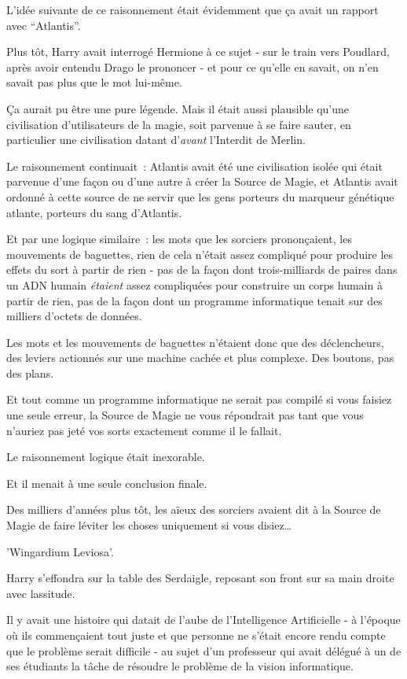 L'idée suivante de ce raisonnement était évidemment que ça avait un rapport avec “Atlantis”.

Plus tôt, Harry avait interrogé Hermione à ce sujet - sur le train vers Poudlard, après avoir entendu Drago le prononcer - et pour ce qu'elle en savait, on n'en savait pas plus que le mot lui-même.

Ça aurait pu être une pure légende. Mais il était aussi plausible qu'une civilisation d'utilisateurs de la magie, soit parvenue à se faire sauter, en particulier une civilisation datant d'\emph{avant} l'Interdit de Merlin.

Le raisonnement continuait~: Atlantis avait été une civilisation isolée qui était parvenue d'une façon ou d'une autre à créer la Source de Magie, et Atlantis avait ordonné à cette source de ne servir que les gens porteurs du marqueur génétique atlante, porteurs du sang d'Atlantis.

Et par une logique similaire~: les mots que les sorciers prononçaient, les mouvements de baguettes, rien de cela n'était assez compliqué pour produire les effets du sort à partir de rien - pas de la façon dont trois-milliards de paires dans un ADN humain \emph{étaient} assez compliquées pour construire un corps humain à partir de rien, pas de la façon dont un programme informatique tenait sur des milliers d'octets de données.

Les mots et les mouvements de baguettes n'étaient donc que des déclencheurs, des leviers actionnés sur une machine cachée et plus complexe. Des boutons, pas des plans.

Et tout comme un programme informatique ne serait pas compilé si vous faisiez une seule erreur, la Source de Magie ne vous répondrait pas tant que vous n'auriez pas jeté vos sorts exactement comme il le fallait.

Le raisonnement logique était inexorable.

Et il menait à une seule conclusion finale.

Des milliers d'années plus tôt, les aïeux des sorciers avaient dit à la Source de Magie de faire léviter les choses uniquement si vous disiez…

'Wingardium Leviosa'.

Harry s'effondra sur la table des Serdaigle, reposant son front sur sa main droite avec lassitude.

Il y avait une histoire qui datait de l'aube de l'Intelligence Artificielle - à l'époque où ils commençaient tout juste et que personne ne s'était encore rendu compte que le problème serait difficile - au sujet d'un professeur qui avait délégué à un de ses étudiants la tâche de résoudre le problème de la vision informatique.

